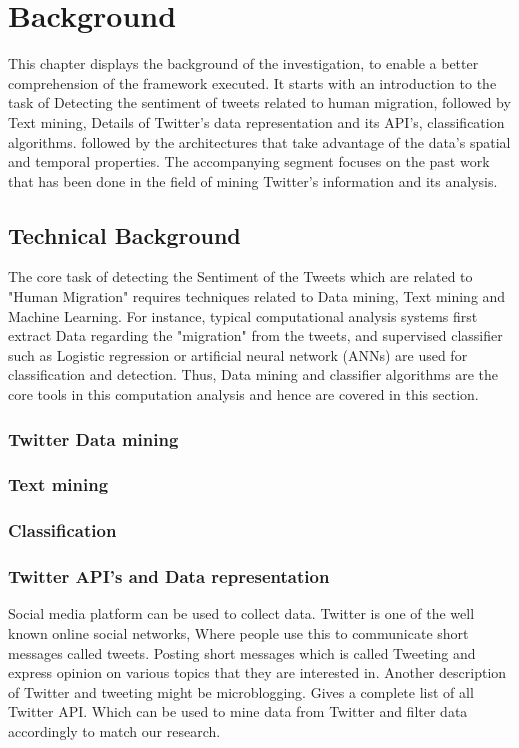 \chapter{Background}\label{chap:background}
This chapter displays the background of the investigation, to enable a better comprehension of the framework executed. It starts with an introduction to the task of Detecting the sentiment of tweets related to human migration, followed by Text mining, Details of Twitter's data representation and its API's, classification algorithms. followed by the architectures that take advantage of the data’s spatial and temporal properties. The accompanying segment focuses on the past work that has been done in the field of mining Twitter's information and its analysis.


    
\section{Technical Background}

The core task of detecting the Sentiment of the Tweets which are related to "Human Migration" requires techniques related to Data mining, Text mining and Machine Learning. For instance, typical computational analysis systems first extract Data regarding the "migration" from the tweets, and supervised classifier such as Logistic regression or artificial neural network (ANNs) are used for classification and detection. Thus, Data mining and classifier algorithms are the core tools in this computation analysis and hence are covered in this section.

\subsection{Twitter Data mining}
\subsection{Text mining}
\subsection{Classification}
\subsection{Twitter API's and Data representation}


Social media platform can be used to collect data. Twitter is one of the well known online social networks, Where people use this to communicate short messages called tweets. Posting short messages which is called Tweeting and express opinion on various topics that they are interested in. Another description of Twitter and tweeting might be microblogging. \cite{TwitterDevDocs} Gives a
complete list of all Twitter API. Which can be used to mine data from Twitter and filter data
accordingly to match our research. 

